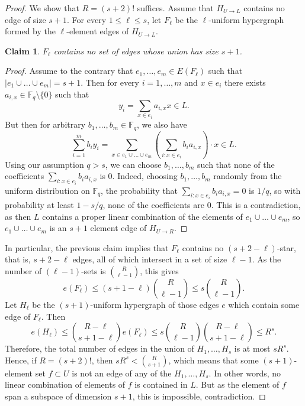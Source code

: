 \documentclass[11pt]{article}
\theoremstyle{plain}
\newtheorem{claim}[theorem]{Claim}
\theoremstyle{definition}
\begin{document}
\begin{proof}
We show that $R=(s+2)!$ suffices. Assume that $H_{U\rightarrow L}$ contains no edge of size $s+1$. For every $1\leq \ell\leq s$, let $F_{\ell}$ be the $\ell$-uniform hypergraph formed by the $\ell$-element edges of $H_{U\rightarrow L}$. 

\begin{claim}
$F_{\ell}$ contains no set of edges whose union has size $s+1$.
\end{claim}
\begin{proof}
Assume to the contrary that $e_1,\dots,e_m\in E(F_{\ell})$ such that $|e_1\cup\dots\cup e_m|=s+1$. Then for every $i=1,\dots,m$ and $x\in e_i$ there exists $a_{i,x}\in\mathbb{F}_q\setminus\{0\}$ such that 
$$y_i=\sum_{x\in e_i}a_{i,x} x\in L.$$
But then for arbitrary $b_1,\dots,b_m\in \mathbb{F}_q$, we also have
$$\sum_{i=1}^m b_i y_i=\sum_{x\in e_1\cup\dots \cup e_m} \left(\sum_{i: x\in e_i} b_i a_{i,x}\right)\cdot x\in L.$$
Using our assumption $q>s$, we can choose $b_1,\dots,b_m$ such that none of the coefficients $\sum_{i: x\in e_i} b_i a_{i,x}$ is $0$. Indeed, choosing $b_1,\dots,b_m$ randomly from the uniform distribution on $\mathbb{F}_q$, the probability that $\sum_{i:x\in e_i}b_i a_{i,x}=0$ is $1/q$, so with probability at least $1-s/q$, none of the coefficients are 0. This is a contradiction, as then $L$ contains a proper linear combination of the elements of $e_1\cup \dots\cup e_m$, so $e_1\cup\dots\cup e_m$ is an $s+1$ element edge of $H_{U\rightarrow R}$.
\end{proof}

In particular, the previous claim implies that $F_{\ell}$ contains no $(s+2-\ell)$-star, that is, $s+2-\ell$ edges, all of which intersect in a set of size $\ell-1$. As the number of $(\ell-1)$-sets is $\binom{R}{\ell-1}$, this gives
$$e(F_{\ell})\leq (s+1-\ell)\binom{R}{\ell-1}\leq s\binom{R}{\ell-1}.$$
Let $H_{\ell}$ be the $(s+1)$-uniform hypergraph of those edges $e$ which contain some edge of $F_{\ell}$. Then
$$e(H_{\ell})\leq \binom{R-\ell}{s+1-\ell}e(F_{\ell})\leq s\binom{R}{\ell-1}\binom{R-\ell}{s+1-\ell}\leq R^{s}.$$
Therefore, the total number of edges in the union of $H_{1},\dots,H_s$ is at most $s R^s$. Hence, if $R=(s+2)!$, then $sR^s<\binom{R}{s+1}$, which means that some $(s+1)$-element set $f\subset U$ is not an edge of any of the $H_1,\dots,H_s$. In other words, no linear combination of elements of $f$ is contained in $L$. But as the element of $f$ span a subspace of dimension $s+1$, this is impossible, contradiction.
\end{proof}
\end{document}
